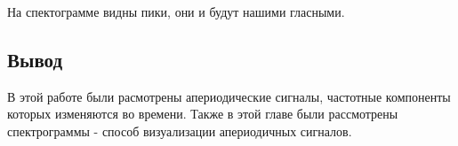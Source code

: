 На спектограмме видны пики, они и будут нашими гласными.

\subsection{Вывод}

В этой работе были расмотрены апериодические сигналы, частотные компоненты которых изменяются во времени. Также в этой главе были рассмотрены спектрограммы - способ визуализации апериодичных сигналов.